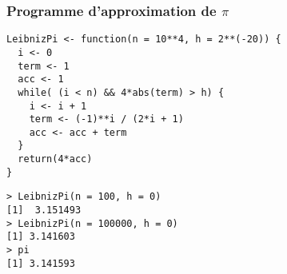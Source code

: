 \documentclass[10pt]{beamer}
\begin{document}
\begin{frame}[fragile]
  \frametitle{Programme d'approximation de $\pi$}
  \begin{lstlisting}[style=editor]
LeibnizPi <- function(n = 10**4, h = 2**(-20)) {
  i <- 0
  term <- 1
  acc <- 1
  while( (i < n) && 4*abs(term) > h) {
    i <- i + 1
    term <- (-1)**i / (2*i + 1)
    acc <- acc + term
  }
  return(4*acc)
}
\end{lstlisting}

\begin{lstlisting}
> LeibnizPi(n = 100, h = 0)
[1]  3.151493
> LeibnizPi(n = 100000, h = 0)
[1] 3.141603
> pi
[1] 3.141593
\end{lstlisting}

\end{frame}
\end{document}
